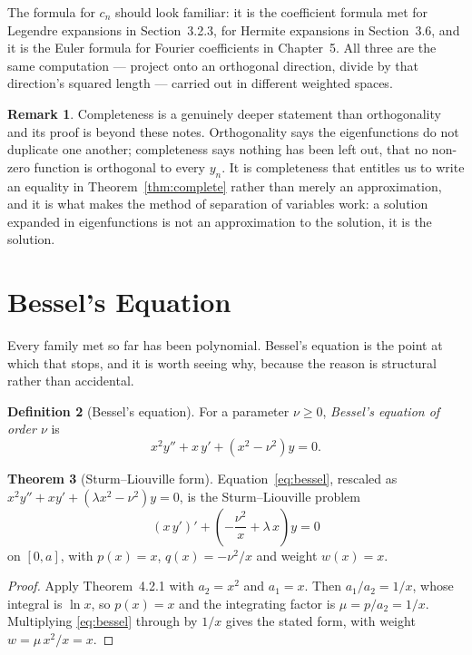\documentclass[12pt,a4paper]{report}
\theoremstyle{definition}
\newtheorem{thm}{Theorem}[section]
\newtheorem{defn}[thm]{Definition}
\newtheorem{remark}[thm]{Remark}
\theoremstyle{plain}
\begin{document}
The formula for $c_n$ should look familiar: it is the coefficient formula met
for Legendre expansions in Section~3.2.3, for Hermite expansions in
Section~3.6, and it is the Euler formula for Fourier coefficients in
Chapter~5. All three are the same computation --- project onto an orthogonal
direction, divide by that direction's squared length --- carried out in
different weighted spaces.

\begin{remark}
Completeness is a genuinely deeper statement than orthogonality and its proof is
beyond these notes. Orthogonality says the eigenfunctions do not duplicate one
another; completeness says nothing has been left out, that no non-zero function
is orthogonal to every $y_n$. It is completeness that entitles us to write an
equality in Theorem~\ref{thm:complete} rather than merely an approximation, and
it is what makes the method of separation of variables work: a solution
expanded in eigenfunctions is not an approximation to the solution, it is the
solution.
\end{remark}

\section{Bessel's Equation}

Every family met so far has been polynomial. Bessel's equation is the point at
which that stops, and it is worth seeing why, because the reason is structural
rather than accidental.

\begin{defn}[Bessel's equation]
For a parameter $\nu\geq0$, \emph{Bessel's equation of order $\nu$} is
\begin{equation}
x^{2}y'' + x\,y' + \left(x^{2}-\nu^{2}\right)y = 0 .
\label{eq:bessel}
\end{equation}
\end{defn}

\begin{thm}[Sturm--Liouville form]
Equation~\eqref{eq:bessel}, rescaled as
$x^{2}y''+xy'+\left(\lambda x^{2}-\nu^{2}\right)y=0$, is the Sturm--Liouville
problem
$$\left(x\,y'\right)' + \left(-\frac{\nu^{2}}{x} + \lambda\,x\right)y = 0$$
on $[0,a]$, with $p(x)=x$, $q(x)=-\nu^{2}/x$ and weight $w(x)=x$.
\end{thm}

\begin{proof}
Apply Theorem~4.2.1 with $a_2 = x^{2}$ and $a_1 = x$. Then $a_1/a_2 = 1/x$,
whose integral is $\ln x$, so $p(x)=x$ and the integrating factor is
$\mu = p/a_2 = 1/x$. Multiplying \eqref{eq:bessel} through by $1/x$ gives the
stated form, with weight $w=\mu\,x^{2}/x = x$.
\end{proof}
\end{document}
